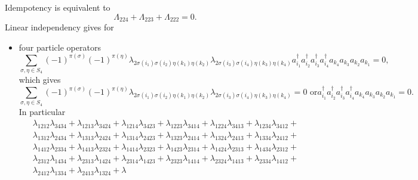 \documentclass[aps,preprint]{revtex4}%
\begin{document}
Idempotency is equivalent to
\begin{equation}
\Lambda_{224}+\Lambda_{223}+\Lambda_{222}=0.
\end{equation}
Linear independency gives for

\begin{itemize}
\item four particle operators%
\begin{equation}
\sum_{\sigma,\eta\in S_{4}}\left(  -1\right)  ^{\pi\left(  \sigma\right)
}\left(  -1\right)  ^{\pi\left(  \eta\right)  }\lambda_{2\sigma\left(
i_{1}\right)  \sigma\left(  i_{2}\right)  \eta\left(  k_{1}\right)
\eta\left(  k_{2}\right)  }\lambda_{2\sigma\left(  i_{3}\right)  \sigma\left(
i_{4}\right)  \eta\left(  k_{3}\right)  \eta\left(  k_{4}\right)  }a_{i_{1}%
}^{\dagger}a_{i_{2}}^{\dagger}a_{i_{3}}^{\dagger}a_{i_{4}}^{\dagger}a_{k_{4}%
}a_{k_{3}}a_{k_{2}}a_{k_{1}}=0,
\end{equation}
which gives%
\begin{equation}
\sum_{\sigma,\eta\in S_{4}}\left(  -1\right)  ^{\pi\left(  \sigma\right)
}\left(  -1\right)  ^{\pi\left(  \eta\right)  }\lambda_{2\sigma\left(
i_{1}\right)  \sigma\left(  i_{2}\right)  \eta\left(  k_{1}\right)
\eta\left(  k_{2}\right)  }\lambda_{2\sigma\left(  i_{3}\right)  \sigma\left(
i_{4}\right)  \eta\left(  k_{3}\right)  \eta\left(  k_{4}\right)  }=0\text{ or
}a_{i_{1}}^{\dagger}a_{i_{2}}^{\dagger}a_{i_{3}}^{\dagger}a_{i_{4}}^{\dagger
}a_{k_{4}}a_{k_{3}}a_{k_{2}}a_{k_{1}}=0.
\end{equation}
In particular
\begin{align}
&  \lambda_{1212}\lambda_{3434}+\lambda_{1213}\lambda_{3424}+\lambda
_{1214}\lambda_{3423}+\lambda_{1223}\lambda_{3414}+\lambda_{1224}%
\lambda_{3413}+\lambda_{1234}\lambda_{3412}+\nonumber\\
&  \lambda_{1312}\lambda_{2434}+\lambda_{1313}\lambda_{2424}+\lambda
_{1314}\lambda_{2423}+\lambda_{1323}\lambda_{2414}+\lambda_{1324}%
\lambda_{2413}+\lambda_{1334}\lambda_{2412}+\nonumber\\
&  \lambda_{1412}\lambda_{2334}+\lambda_{1413}\lambda_{2324}+\lambda
_{1414}\lambda_{2323}+\lambda_{1423}\lambda_{2314}+\lambda_{1424}%
\lambda_{2313}+\lambda_{1434}\lambda_{2312}+\nonumber\\
&  \lambda_{2312}\lambda_{1434}+\lambda_{2313}\lambda_{1424}+\lambda
_{2314}\lambda_{1423}+\lambda_{2323}\lambda_{1414}+\lambda_{2324}%
\lambda_{1413}+\lambda_{2334}\lambda_{1412}+\nonumber\\
&  \lambda_{2412}\lambda_{1334}+\lambda_{2413}\lambda_{1324}+\lambda

\end{align}
\end{itemize}
\end{document}
